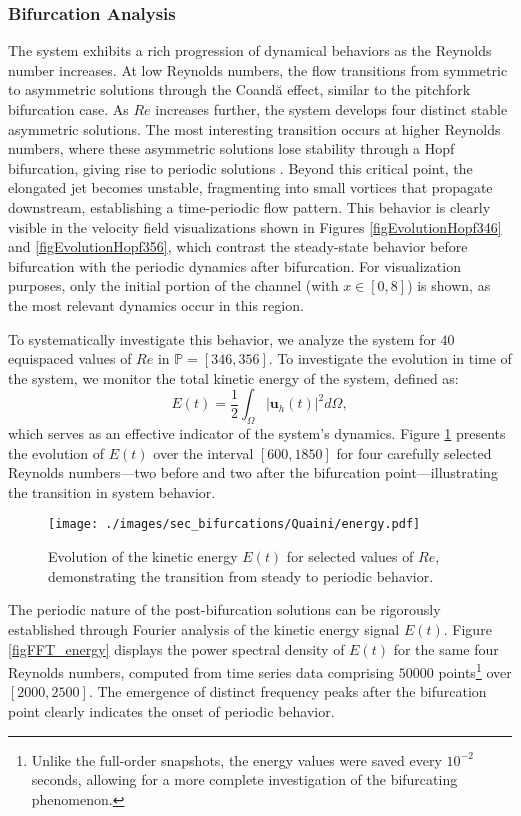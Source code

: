\documentclass[reqno]{amsart}[standalone]
\theoremstyle{definition}
\theoremstyle{remark}
\newcommand{\bs}{\boldsymbol}
\begin{document}
\subsubsection*{Bifurcation Analysis}

The system exhibits a rich progression of dynamical behaviors as the Reynolds number increases. At low Reynolds numbers, the flow transitions from symmetric to asymmetric solutions through the Coandă effect, similar to the pitchfork bifurcation case. As $Re$ increases further, the system develops four distinct stable asymmetric solutions. The most interesting transition occurs at higher Reynolds numbers, where these asymmetric solutions lose stability through a Hopf bifurcation, giving rise to periodic solutions \parencite{QUAINI}. Beyond this critical point, the elongated jet becomes unstable, fragmenting into small vortices that propagate downstream, establishing a time-periodic flow pattern. This behavior is clearly visible in the velocity field visualizations shown in Figures \ref{figEvolutionHopf346} and \ref{figEvolutionHopf356}, which contrast the steady-state behavior before bifurcation with the periodic dynamics after bifurcation.
For visualization purposes, only the initial portion of the channel (with $x\in[0,8]$) is shown, as the most relevant dynamics occur in this region.

To systematically investigate this behavior, we analyze the system for $40$ equispaced values of $Re$ in  $\mathbb{P}=[346, 356]$. To investigate the evolution in time of the system, we monitor the total kinetic energy of the system, defined as:
\begin{equation*}
E(t) = \frac{1}{2}\int_\Omega|\bs{u}_h(t)|^2d\Omega,
\end{equation*}
which serves as an effective indicator of the system's dynamics. Figure \ref{figENERGY1} presents the evolution of $E(t)$ over the interval $[600, 1850]$ for four carefully selected Reynolds numbers—two before and two after the bifurcation point—illustrating the transition in system behavior.

\begin{figure}[ht]
	\centering
    \texttt{[image: ./images/sec\_bifurcations/Quaini/energy.pdf]}
	\caption{Evolution of the kinetic energy $E(t)$ for selected values of $Re$, demonstrating the transition from steady to periodic behavior.}
	\label{figENERGY1}
\end{figure}

The periodic nature of the post-bifurcation solutions can be rigorously established through Fourier analysis of the kinetic energy signal $E(t)$. Figure \ref{figFFT_energy} displays the power spectral density of $E(t)$ for the same four Reynolds numbers, computed from time series data comprising $\num{50000}$ points\footnote{Unlike the full-order snapshots, the energy values were saved every $10^{-2}$ seconds, allowing for a more complete investigation of the bifurcating phenomenon.} over $[\num{2000}, \num{2500}]$. The emergence of distinct frequency peaks after the bifurcation point clearly indicates the onset of periodic behavior.
\end{document}
